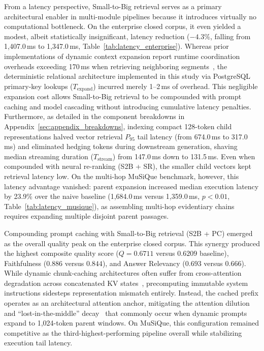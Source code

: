 From a latency perspective, Small-to-Big retrieval serves as a primary architectural enabler in multi-module pipelines because it introduces virtually no computational bottleneck. On the enterprise closed corpus, it even yielded a modest, albeit statistically insignificant, latency reduction ($-4.3\%$, falling from 1,407.0\,ms to 1,347.0\,ms, Table~\ref{tab:latency_enterprise}). Whereas prior implementations of dynamic context expansion report runtime coordination overheads exceeding 170\,ms when retrieving neighboring segments~\citep{lumer2026rethinking}, the deterministic relational architecture implemented in this study via PostgreSQL primary-key lookups ($T_{\text{expand}}$) incurred merely 1--2\,ms of overhead. This negligible expansion cost allows Small-to-Big retrieval to be compounded with prompt caching and model cascading without introducing cumulative latency penalties. Furthermore, as detailed in the component breakdowns in Appendix~\ref{sec:appendix_breakdowns}, indexing compact 128-token child representations halved vector retrieval $P_{95}$ tail latency (from 674.0\,ms to 317.0\,ms) and eliminated hedging tokens during downstream generation, shaving median streaming duration ($T_{\text{stream}}$) from 147.0\,ms down to 131.5\,ms. Even when compounded with neural re-ranking (S2B + SR), the smaller child vectors kept retrieval latency low. On the multi-hop MuSiQue benchmark, however, this latency advantage vanished: parent expansion increased median execution latency by 23.9\% over the naive baseline (1,684.0\,ms versus 1,359.0\,ms, $p < 0.01$, Table~\ref{tab:latency_musique}), as assembling multi-hop evidentiary chains requires expanding multiple disjoint parent passages.

Compounding prompt caching with Small-to-Big retrieval (S2B + PC) emerged as the overall quality peak on the enterprise closed corpus. This synergy produced the highest composite quality score ($Q = 0.6711$ versus $0.6209$ baseline), Faithfulness ($0.886$ versus $0.844$), and Answer Relevancy ($0.693$ versus $0.666$). While dynamic chunk-caching architectures often suffer from cross-attention degradation across concatenated KV states~\citep{yao2025cacheblend, wang2026fusionrag}, precomputing immutable system instructions sidesteps representation mismatch entirely. Instead, the cached prefix operates as an architectural attention anchor, mitigating the attention dilution and ``lost-in-the-middle'' decay~\citep{liu2024lost} that commonly occur when dynamic prompts expand to 1,024-token parent windows. On MuSiQue, this configuration remained competitive as the third-highest-performing pipeline overall while stabilizing execution tail latency.

